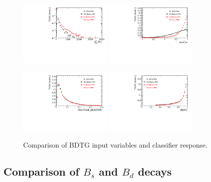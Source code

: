 \begin{figure}[h]
\includegraphics[height=!,width=0.4\textwidth]{figs/dataVsMC/trigger_norm/Ds2all_Ds_FDCHI2_ORIVX.pdf}
\includegraphics[height=!,width=0.4\textwidth]{figs/dataVsMC/trigger_norm/Ds2all_maxCos.pdf}

\includegraphics[height=!,width=0.4\textwidth]{figs/dataVsMC/trigger_norm/Ds2all_max_ghostProb.pdf}
\includegraphics[height=!,width=0.4\textwidth]{figs/dataVsMC/trigger_norm/Ds2all_BDTG_response.pdf}

\caption{Comparison of BDTG input variables and classifier response.}
\label{fig:}
\end{figure}










\clearpage
\subsection{Comparison of $B_s$ and $B_d$ decays}

